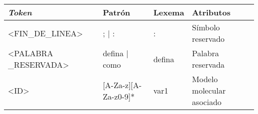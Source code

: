 \begin{landscape}
    \footnotesize
    \begin{longtable}{| p{0.2\textheight} | p{0.75\textheight} | p{0.2\textheight} | p{0.25\textheight} |}
        \hline
        \textit{Token}                 & Patrón                                                                                                                                                                                                                                                                                                                                                                                                                                                                                                                                                       & Lexema        & Atributos                                                              \\\hline
        <FIN\_DE\_LINEA>               & ; | :                                                                                                                                                                                                                                                                                                                                                                                                                                                                                                                                                        & :             & Símbolo reservado                                                      \\\hline
        <PALABRA \_RESERVADA>          & defina | como                                                                                                                                                                                                                                                                                                                                                                                                                                                                                                                                                & defina        & Palabra reservada                                                      \\\hline
        <ID>                           & [A-Za-z][A-Za-z0-9]*                                                                                                                                                                                                                                                                                                                                                                                                                                                                                                                                         & var1          & Modelo molecular asociado                                              \\\hline

\end{longtable}
\end{landscape}
